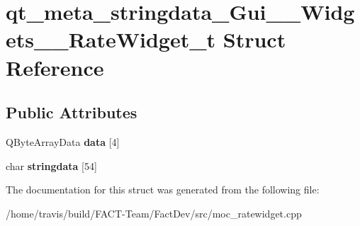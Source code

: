 \hypertarget{structqt__meta__stringdata__Gui____Widgets____RateWidget__t}{\section{qt\-\_\-meta\-\_\-stringdata\-\_\-\-Gui\-\_\-\-\_\-\-Widgets\-\_\-\-\_\-\-Rate\-Widget\-\_\-t Struct Reference}
\label{structqt__meta__stringdata__Gui____Widgets____RateWidget__t}
}
\subsection*{Public Attributes}
\begin{DoxyCompactItemize}
\item 
\hypertarget{structqt__meta__stringdata__Gui____Widgets____RateWidget__t_a69c557a0aae1402c3bc88d3c54b926d7}{Q\-Byte\-Array\-Data {\bfseries data} \mbox{[}4\mbox{]}}\label{structqt__meta__stringdata__Gui____Widgets____RateWidget__t_a69c557a0aae1402c3bc88d3c54b926d7}

\item 
\hypertarget{structqt__meta__stringdata__Gui____Widgets____RateWidget__t_afa083258b769f35954120e97d02431e2}{char {\bfseries stringdata} \mbox{[}54\mbox{]}}\label{structqt__meta__stringdata__Gui____Widgets____RateWidget__t_afa083258b769f35954120e97d02431e2}

\end{DoxyCompactItemize}


The documentation for this struct was generated from the following file\-:\begin{DoxyCompactItemize}
\item 
/home/travis/build/\-F\-A\-C\-T-\/\-Team/\-Fact\-Dev/src/moc\-\_\-ratewidget.\-cpp\end{DoxyCompactItemize}
